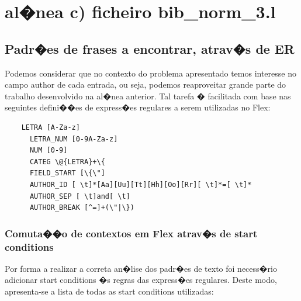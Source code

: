 \documentclass{report}
\begin{document}


      \section{al�nea c) ficheiro bib\_norm\_3.l }
    \subsection{Padr�es de frases a encontrar, atrav�s de ER}
    Podemos considerar que no contexto do problema apresentado temos interesse no campo author de cada  entrada, ou seja, podemos reaproveitar grande parte do trabalho desenvolvido na al�nea anterior. Tal tarefa � facilitada com base nas seguintes defini��es de express�es regulares a serem utilizadas no Flex:

      \begin{lstlisting}
    LETRA [A-Za-z]
      LETRA_NUM [0-9A-Za-z]
      NUM [0-9]
      CATEG \@{LETRA}+\{
      FIELD_START [\{\"]
      AUTHOR_ID [ \t]*[Aa][Uu][Tt][Hh][Oo][Rr][ \t]*=[ \t]*
      AUTHOR_SEP [ \t]and[ \t]
      AUTHOR_BREAK [^=]+(\"|\})
      \end{lstlisting}


    \subsubsection{Comuta��o de contextos em Flex atrav�s de start conditions}
    Por forma a realizar a correta an�lise dos padr�es de texto foi necess�rio adicionar start conditions �s regras das express�es regulares. Deste modo, apresenta-se a lista de todas as start conditions utilizadas:
\end{document}
